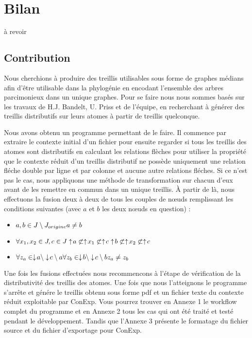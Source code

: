 \chapter{Bilan}

à revoir

\section{Contribution}

Nous cherchions à produire des treillis utilisables sous forme de graphes médians afin d'être utilisable dans la phylogénie en encodant l'ensemble des arbres parcimonieux dans un unique graphes. Pour se faire nous nous sommes basés sur les travaux de H.J. Bandelt, U. Priss et de l'équipe, en recherchant à générer des treillis distributifs sur leurs atomes à partir de treillis quelconque.

\smallbreak

Nous avons obtenu un programme permettant de le faire. Il commence par extraire le contexte initial d'un fichier pour ensuite regarder si tous les treillis des atomes sont distributifs en calculant les relations flèches pour utiliser la propriété que le contexte réduit d'un treillis distributif ne possède uniquement une relation fléche double par ligne et par colonne et aucune autre relations fléches. Si ce n'est pas le cas, nous appliquons une méthode de transformation sur chacun d'eux avant de les remettre en commun dans un unique treillis. À partir de là, nous effectuons la fusion deux à deux de tous les couples de n\oe uds remplissant les conditions suivantes (avec $a$ et $b$ les deux n\oe uds en question) :
\begin{itemize}
	\item $a, b \in J \setminus J_{origine}\\
		a \neq b$
	\item $\forall x_1, x_2 \in J, c \in J\\
		\uparrow \! a \not \subset \uparrow \! x_1 \not \subset \uparrow \! c\\
		\uparrow \! b \not \subset \uparrow \! x_2 \not \subset \uparrow \! c$
	\item $\forall z_a \in \downarrow \! a \setminus \downarrow \! c \setminus a\\
		\forall z_b \in \downarrow \! b \setminus \downarrow \! c \setminus b\\
		z_a \neq z_b$
\end{itemize}
Une fois les fusions effectuées nous recommencons à l'étape de vérification de la distributivité des treillis des atomes. Une fois que nous l'atteignons le programme s'arrête et génére le treillis obtenu sous forme pdf et un fichier texte du contexte réduit exploitable par ConExp. Vous pourrez trouver en Annexe 1 le workflow complet du programme et en Annexe 2 tous les cas qui ont été traité et testé pendant le développement. Tandis que l'Annexe 3 présente le formatage du fichier source et du fichier d'exportage pour ConExp.

